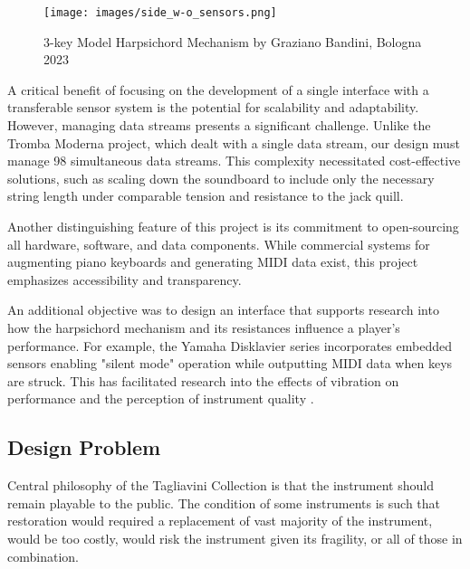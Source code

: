 \begin{figure}  
  \centering
  \texttt{[image: images/side\_w-o\_sensors.png]} 
  \caption{3-key Model Harpsichord Mechanism by Graziano Bandini, Bologna 2023} 
  \label{fig:3key}
\end{figure}

A critical benefit of focusing on the development of a single interface with a transferable sensor system is the potential for scalability and adaptability. However, managing data streams presents a significant challenge. Unlike the Tromba Moderna project, which dealt with a single data stream, our design must manage 98 simultaneous data streams. This complexity necessitated cost-effective solutions, such as scaling down the soundboard to include only the necessary string length under comparable tension and resistance to the jack quill.

Another distinguishing feature of this project is its commitment to open-sourcing all hardware, software, and data components. While commercial systems for augmenting piano keyboards and generating MIDI data exist, this project emphasizes accessibility and transparency.

An additional objective was to design an interface that supports research into how the harpsichord mechanism and its resistances influence a player’s performance. For example, the Yamaha Disklavier series incorporates embedded sensors enabling "silent mode" operation while outputting MIDI data when keys are struck. This has facilitated research into the effects of vibration on performance \cite{MusicalHaptics2018_04, MusicalHaptics2018_13} and the perception of instrument quality \cite{MusicalHaptics2018_05}.

\subsection{Design Problem}\label{design-problem}

Central philosophy of the Tagliavini Collection is that the instrument
should remain playable to the public. The condition of some instruments
is such that restoration would required a replacement of vast majority
of the instrument, would be too costly, would risk the instrument given
its fragility, or all of those in combination.

